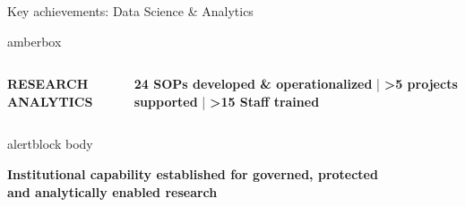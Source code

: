 \documentclass[aspectratio=169,11pt]{beamer}
\begin{document}
\begin{frame}{Key achievements: Data Science \& Analytics}
\begin{beamercolorbox}[
    wd=\textwidth,
    sep=0.16cm,
    rounded=true
]{amberbox}

\begin{columns}[c,totalwidth=\textwidth]

\textcolor{execamber}{\textbf{RESEARCH ANALYTICS}}

\raggedright
{\normalsize
\textbf{24 SOPs developed \& operationalized }|
\textbf{>5 projects supported} | 
\textbf{>15 Staff trained}
}

\end{columns}

\end{beamercolorbox}

\vspace{0.18cm}


\begin{beamercolorbox}[
    wd=\textwidth,
    sep=0.14cm,
    rounded=true
]{alertblock body}

\centering
{\large
\textbf{Institutional capability established for governed, protected}\\
\textbf{and analytically enabled research}
}

\end{beamercolorbox}

\end{frame}
\end{document}
